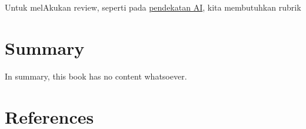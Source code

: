\documentclass[
  letterpaper,
  DIV=11,
  numbers=noendperiod]{scrreprt}
\begin{document}
Untuk melAkukan review, seperti pada
\href{../My_Personal_Reviews/Doc.5.Mengevaluasi-Esai-Berdasarkan-Rubrik.pdf}{pendekatan
AI}, kita membutuhkan rubrik


\chapter{Summary}\label{summary}

In summary, this book has no content whatsoever.


\chapter*{References}\label{references}


\label{refs}
\end{document}
